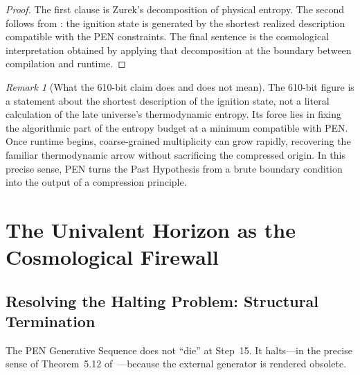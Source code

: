 \documentclass[11pt,a4paper]{article}
\theoremstyle{plain}
\theoremstyle{definition}
\theoremstyle{remark}
\newtheorem{remark}[theorem]{Remark}
\begin{document}
\begin{proof}
The first clause is Zurek's decomposition of physical entropy.
The second follows from : the ignition state is generated by the shortest realized description compatible with the PEN constraints.
The final sentence is the cosmological interpretation obtained by applying that decomposition at the boundary between compilation and runtime.
\end{proof}

\begin{remark}[What the 610-bit claim does and does not mean]
\label{rem:entropy}
The 610-bit figure is a statement about the shortest description of the ignition state, not a literal calculation of the late universe's thermodynamic entropy.
Its force lies in fixing the algorithmic part of the entropy budget at a minimum compatible with PEN.
Once runtime begins, coarse-grained multiplicity can grow rapidly, recovering the familiar thermodynamic arrow without sacrificing the compressed origin.
In this precise sense, PEN turns the Past Hypothesis from a brute boundary condition into the output of a compression principle.
\end{remark}


\section{The Univalent Horizon as the Cosmological Firewall}
\label{sec:firewall}

\subsection{Resolving the Halting Problem: Structural Termination}
\label{sec:termination}

The PEN Generative Sequence does not ``die'' at Step~15.
It halts---in the precise sense of Theorem~5.12 of~\cite{pen}---because the external generator is rendered obsolete.
\end{document}
